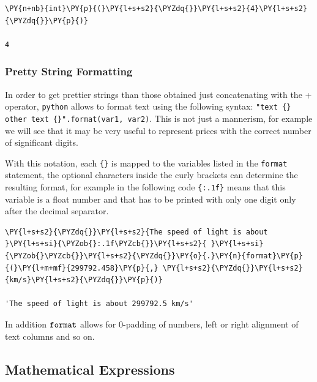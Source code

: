 \begin{tcolorbox}[breakable, size=fbox, boxrule=1pt, pad at break*=1mm, colback=cellbackground, colframe=cellborder]            
\begin{Verbatim}[commandchars=\\\{\}]
\PY{n+nb}{int}\PY{p}{(}\PY{l+s+s2}{\PYZdq{}}\PY{l+s+s2}{4}\PY{l+s+s2}{\PYZdq{}}\PY{p}{)}

4
\end{Verbatim}
\end{tcolorbox}

\subsubsection{Pretty String Formatting}
In order to get prettier strings than those obtained just concatenating with the + operator, \texttt{python} allows to format text using the following syntax: \texttt{"text \{\} other text \{\}".format(var1, var2)}.
This is not just a mannerism, for example we will see that it may be very useful to represent prices with the correct 
number of significant digits.

With this notation, each \texttt{\{\}} is mapped to the variables listed in the \texttt{format} statement, the optional characters inside the curly brackets can determine the resulting format, for example in the following code \texttt{\{:.1f\}} means that this variable is a float number and that has to be printed with only one digit only after the decimal separator. 

\begin{tcolorbox}[breakable, size=fbox, boxrule=1pt, pad at break*=1mm, colback=cellbackground, colframe=cellborder]            
\begin{Verbatim}[commandchars=\\\{\}]
\PY{l+s+s2}{\PYZdq{}}\PY{l+s+s2}{The speed of light is about }\PY{l+s+si}{\PYZob{}:.1f\PYZcb{}}\PY{l+s+s2}{ }\PY{l+s+si}{\PYZob{}\PYZcb{}}\PY{l+s+s2}{\PYZdq{}}\PY{o}{.}\PY{n}{format}\PY{p}{(}\PY{l+m+mf}{299792.458}\PY{p}{,} \PY{l+s+s2}{\PYZdq{}}\PY{l+s+s2}{km/s}\PY{l+s+s2}{\PYZdq{}}\PY{p}{)}

'The speed of light is about 299792.5 km/s'
\end{Verbatim}
\end{tcolorbox}

In addition $\tt{format}$ allows for 0-padding of numbers, left or right alignment of text columns and so on.

\subsection{Mathematical Expressions}\label{mathematical-expressions}

